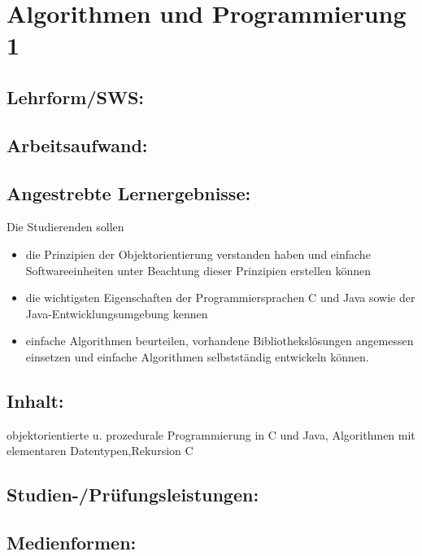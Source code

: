 \chapter{Algorithmen und Programmierung
1}\label{algorithmen-und-programmierung-1}

\section{Lehrform/SWS:}\label{lehrformsws}

\section{Arbeitsaufwand:}\label{arbeitsaufwand}

\section{Angestrebte
Lernergebnisse:}\label{angestrebte-lernergebnisse}

Die Studierenden sollen

\begin{itemize}
\tightlist
\item
  die Prinzipien der Objektorientierung verstanden haben und einfache
  Softwareeinheiten unter Beachtung dieser Prinzipien erstellen können
\item
  die wichtigsten Eigenschaften der Programmiersprachen C und Java sowie
  der Java-Entwicklungsumgebung kennen
\item
  einfache Algorithmen beurteilen, vorhandene Bibliothekslösungen
  angemessen einsetzen und einfache Algorithmen selbstständig entwickeln
  können.
\end{itemize}

\section{Inhalt:}\label{inhalt}

objektorientierte u. prozedurale Programmierung in C und Java,
Algorithmen mit elementaren Datentypen,Rekursion C

\section{Studien-/Prüfungsleistungen:}\label{studien-pruxfcfungsleistungen}

\section{Medienformen:}\label{medienformen}

